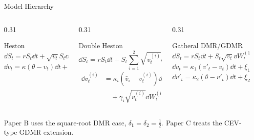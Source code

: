\begin{frame}{Model Hierarchy}
  \begin{columns}[T,onlytextwidth]
    \begin{column}{0.31\textwidth}
      \begin{block}{Heston}
        {\scriptsize
        \[
          \dd S_t=rS_t\dd t+\sqrt{v_t}S_t\dd W_t^{(1)}
        \]
        \[
          \dd v_t=\kappa(\theta-v_t)\dd t+\xi\sqrt{v_t}\dd W_t^{(2)}
        \]}
      \end{block}
    \end{column}
    \begin{column}{0.31\textwidth}
      \begin{block}{Double Heston}
        {\tiny
        \[
          \dd S_t=rS_t\dd t+
          S_t\sum_{i=1}^2\sqrt{v_t^{(i)}}\dd W_t^{(i)}
        \]
        \[
        \begin{aligned}
          \dd v_t^{(i)}
          &=\kappa_i(\bar v_i-v_t^{(i)})\dd t\\
          &\quad+\gamma_i\sqrt{v_t^{(i)}}\dd W_t^{(i+2)},
          \quad i=1,2.
        \end{aligned}
        \]}
      \end{block}
    \end{column}
    \begin{column}{0.31\textwidth}
      \begin{block}{Gatheral DMR/GDMR}
        {\tiny
        \[
          \dd S_t=rS_t\dd t+S_t\sqrt{v_t}\dd W_t^{(1)}
        \]
        \[
          \dd v_t=\kappa_1(v'_t-v_t)\dd t+
          \xi_1 v_t^{\delta_1}\dd W_t^{(2)}
        \]
        \[
          \dd v'_t=\kappa_2(\theta-v'_t)\dd t+
          \xi_2(v'_t)^{\delta_2}\dd W_t^{(3)}
        \]}
      \end{block}
    \end{column}
  \end{columns}

  \vspace{0.35em}
  \begin{center}
    \small Paper B uses the square-root DMR case, \(\delta_1=\delta_2=\tfrac12\). Paper C treats the CEV-type GDMR extension.
  \end{center}
\end{frame}

